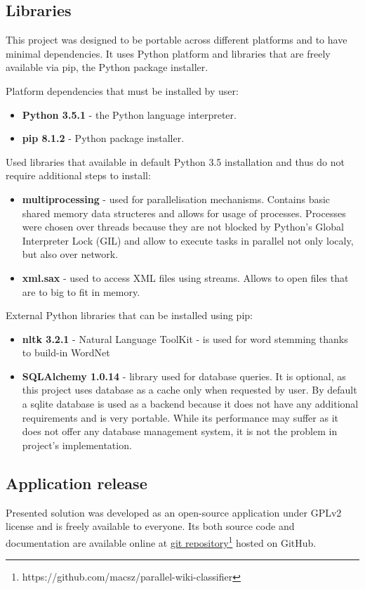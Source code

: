  
 
 
\subsection{Libraries} \label{design-libraries}
This project was designed to be portable across different platforms and to have minimal dependencies. It uses Python platform and libraries that are freely available via pip, the Python package installer.

Platform dependencies that must be installed by user:
\begin{itemize}
	\item \textbf{Python 3.5.1} - the Python language interpreter.
	\item\textbf{pip 8.1.2} - Python package installer.
\end{itemize}

Used libraries that available in default Python 3.5 installation and thus do not require additional steps to install:
\begin{itemize}
	\item \textbf{multiprocessing} - used for parallelisation mechanisms. Contains basic shared memory data structeres and allows for usage of processes. Processes were chosen over threads because they are not blocked by Python's Global Interpreter Lock (GIL) and allow to execute tasks in parallel not only localy, but also over network.
	\item \textbf{xml.sax} - used to access XML files using streams. Allows to open files that are to big to fit in memory.
\end{itemize}

External Python libraries that can be installed using pip:
\begin{itemize}
	\item \textbf{nltk 3.2.1} - Natural Language ToolKit - is used for word stemming thanks to build-in WordNet
	\item \textbf{SQLAlchemy 1.0.14} - library used for database queries. It is optional, as this project uses database as a cache only when requested by user. By default a sqlite database is used as a backend because it does not have any additional requirements and is very portable. While its performance may suffer as it does not offer any database management system, it is not the problem in project's implementation.
\end{itemize}


\subsection{Application release}
Presented solution was developed as an open-source application under GPLv2 license and is freely available to everyone. Its both source code and documentation are available online at \href{https://github.com/macsz/parallel-wiki-classifier}{git repository\footnote{https://github.com/macsz/parallel-wiki-classifier} hosted on GitHub}.


